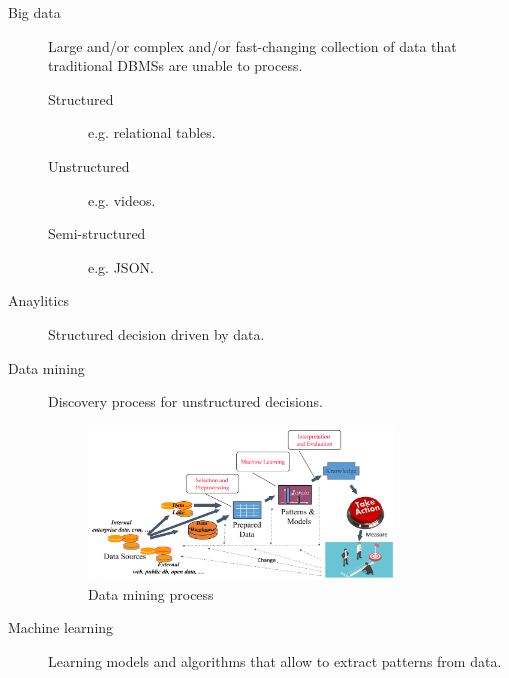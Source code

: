 \begin{description}
    \item[Big data] 
        Large and/or complex and/or fast-changing collection of data that traditional DBMSs are unable to process.
        \begin{description}
            \item[Structured] e.g. relational tables.
            \item[Unstructured] e.g. videos.
            \item[Semi-structured] e.g. JSON.   
        \end{description}

    \item[Anaylitics] 
        Structured decision driven by data.

    \item[Data mining] 
        Discovery process for unstructured decisions.
        \begin{figure}[ht]
            \centering
            \includegraphics[width=0.8\textwidth]{img/data_mining_process.png}
            \caption{Data mining process}
        \end{figure}

    \item[Machine learning] 
        Learning models and algorithms that allow to extract patterns from data.
\end{description}